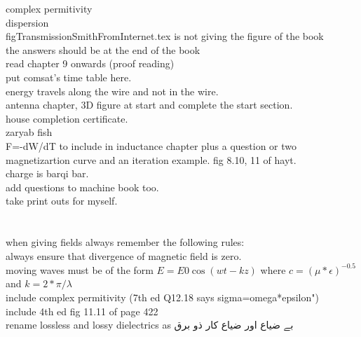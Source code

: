 \begin{otherlanguage}{english}
complex permitivity\\
dispersion\\
figTransmissionSmithFromInternet.tex is not giving the figure of the book\\
the answers should be at the end of the book\\
read chapter 9 onwards (proof reading)\\
put comsat's time table here.\\
energy travels along the wire and not in the wire.\\
antenna chapter, 3D figure at start and complete the start section.\\
house completion certificate.\\
zaryab fish\\
F=-dW/dT to include in inductance chapter plus a question or two\\
magnetizartion curve and an iteration example. fig 8.10, 11 of hayt.\\
charge is barqi bar.\\
add questions to machine book too.\\
take print outs for myself.\\
\\
\\
when giving fields always remember the following rules:\\
always ensure that divergence of magnetic field is zero.\\
moving waves must be of the form $E=E0 \cos(wt-kz)$ where $c=(\mu*\epsilon)^{-0.5}$ and $k=2*\pi/\lambda$\\
include complex permitivity  (7th ed Q12.18 says sigma=omega*epsilon")\\
include 4th ed fig 11.11 of page 422\\
rename lossless and lossy dielectrics as بے ضیاع اور ضیاع کار ذو برق
\end{otherlanguage}
